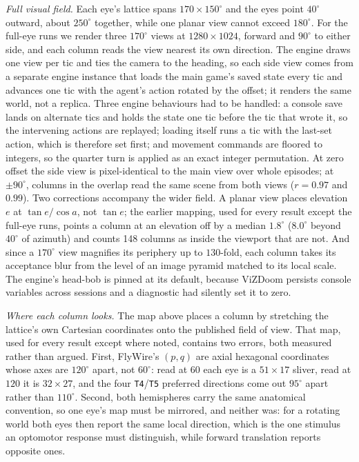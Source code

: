 \documentclass[10pt,twoside]{article}
\newcommand{\cell}[1]{\texttt{#1}}
\begin{document}
\emph{Full visual field.} Each eye's lattice spans $170\times150^\circ$ and the
eyes point $40^\circ$ outward, about $250^\circ$ together, while one planar view
cannot exceed $180^\circ$. For the full-eye runs we render three
$170^\circ$ views at $1280\times1024$, forward and $90^\circ$ to either side,
and each column reads the view nearest its own direction. The engine draws one
view per tic and ties the camera to the heading, so each side view comes from a
separate engine instance that loads the main game's saved state every tic and
advances one tic with the agent's action rotated by the offset; it renders the
same world, not a replica. Three engine behaviours had to be handled: a console
save lands on alternate tics and holds the state one tic before the tic that
wrote it, so the intervening actions are replayed; loading itself runs a tic
with the last-set action, which is therefore set first; and movement commands
are floored to integers, so the quarter turn is applied as an exact integer
permutation. At zero offset the side view is pixel-identical to the main view
over whole episodes; at $\pm90^\circ$, columns in the overlap read the same
scene from both views ($r=0.97$ and $0.99$). Two corrections accompany the
wider field. A planar view places elevation $e$ at $\tan e/\cos a$, not
$\tan e$; the earlier mapping, used for every result except the full-eye runs,
points a column at an elevation off by a median $1.8^\circ$ ($8.0^\circ$
beyond $40^\circ$ of azimuth) and counts 148 columns as inside the viewport
that are not. And since a $170^\circ$ view magnifies its periphery up to
$130$-fold, each column takes its acceptance blur from the level of an image
pyramid matched to its local scale. The engine's head-bob is pinned at its
default, because ViZDoom persists console variables across sessions and a
diagnostic had silently set it to zero.

\emph{Where each column looks.} The map above places a column by stretching
the lattice's own Cartesian coordinates onto the published field of view. That
map, used for every result except where noted, contains two errors, both
measured rather than argued. First, FlyWire's $(p,q)$ are axial hexagonal
coordinates whose axes are $120^\circ$ apart, not $60^\circ$: read at $60$
each eye is a $51\times17$ sliver, read at $120$ it is $32\times27$, and the
four \cell{T4}/\cell{T5} preferred directions come out $95^\circ$ apart
rather than $110^\circ$. Second, both hemispheres carry the same anatomical
convention, so one eye's map must be mirrored, and neither was: for a rotating
world both eyes then report the same local direction, which is the one stimulus
an optomotor response must distinguish, while forward translation reports
opposite ones.
\end{document}
